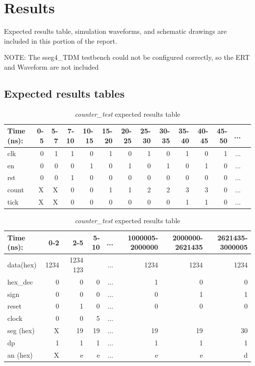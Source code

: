 \documentclass[11pt]{article}
\begin{document}
\section*{Results}
  
Expected results table, simulation waveforms, and schematic drawings are included in this portion of the report.

NOTE: The sseg4\_TDM testbench could not be configured correctly, so the ERT and Waveform are not included

\subsection*{Expected results tables}

\begin{table}[ht]\centering
	\caption{\textit{counter\_test} expected results table}
	\label{ALU:tbl:alu_ERT}\medskip
	\begin{tabular}{l|rrrrrrrrrrrrr}
		Time (ns): & 0-5 & 5-7 & 7-10 & 10-15 & 15-20 & 20-25 & 25-30 & 30-35 & 35-40 & 40-45 & 45-50 &...\\
		\midrule
		clk & 0  & 1 & 1 & 0 & 1 & 0 & 1 & 0 & 1 & 0 & 1 & ... \\
		en & 0 & 0 & 0 & 1 & 0 & 1 & 0 & 1 & 0 & 1 & 0 & ...\\
		rst & 0 & 0 & 1& 0 & 0 & 0 & 0 & 0 & 0 & 0 & 0 & ... \\
		\midrule
		count & X & X & 0 & 0  & 1 & 1 & 2 & 2 & 3 & 3 & 0 & ... \\
		tick & X & X & 0 & 0 & 0 & 0 & 0 & 0 & 1 & 1 & 0& ... \\
		\bottomrule
	\end{tabular}
\end{table}

\begin{table}[ht]\centering
	\caption{\textit{counter\_test} expected results table}
	\label{ALU:tbl:alu_ERT}\medskip
	\begin{tabular}{l|rrrrrrr}
		Time (ns): & 0-2 & 2-5 & 5-10 & ... & 1000005-2000000 & 2000000-2621435 & 2621435-3000005\\
		\midrule
		data(hex) & 1234 & 1234 123 && ... & 1234  & 1234 & 1234  \\
		hex\_dec & 0 & 0 & 0 & ... & 1 &  0 & 0\\
		sign & 0 & 0 & 0 & ... & 0 &  1 & 1 \\
		reset & 0 & 1 & 0 & ... & 0 & 0 & 0  \\
		clock & 0 & 0 & 5 & ...  \\
		\midrule
		seg (hex) & X & 19 & 19 & ... & 19 & 19 & 30 \\
		dp & 1 & 1 & 1 & ... & 1 & 1 & 1 \\
		an (hex)& X & e & e & ... & e & e & d \\
		\bottomrule
	\end{tabular}
\end{table}
\end{document}

